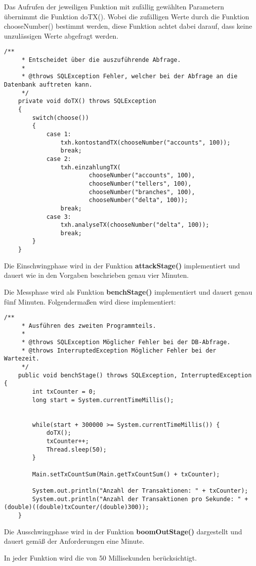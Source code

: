 Das Aufrufen der jeweiligen Funktion mit zufällig gewählten Parametern übernimmt die Funktion
doTX(). Wobei die zufälligen Werte durch die Funktion chooseNumber() bestimmt
werden, diese Funktion achtet dabei darauf, dass keine unzulässigen Werte
abgefragt werden.


\begin{lstlisting}[caption={doTX-Funktion in ProgramStage.java}]
	/**
	 * Entscheidet über die auszuführende Abfrage.
	 * 
	 * @throws SQLException Fehler, welcher bei der Abfrage an die Datenbank auftreten kann.
	 */
	private void doTX() throws SQLException
	{
		switch(choose())
		{
			case 1:
				txh.kontostandTX(chooseNumber("accounts", 100));
				break;
			case 2:
				txh.einzahlungTX(
						chooseNumber("accounts", 100),
						chooseNumber("tellers", 100),
						chooseNumber("branches", 100),
						chooseNumber("delta", 100));
				break;
			case 3:
				txh.analyseTX(chooseNumber("delta", 100));
				break;
		}
	}
\end{lstlisting}

Die Einschwingphase wird in der Funktion \textbf{attackStage()} implementiert
und dauert wie in den Vorgaben beschrieben genau vier Minuten.

Die Messphase wird als Funktion \textbf{benchStage()} implementiert und dauert
genau fünf Minuten. Folgendermaßen wird diese implementiert:

\begin{lstlisting}[caption={benchStage-Funktion in ProgramStage.java}]
	/**
	 * Ausführen des zweiten Programmteils.
	 * 
	 * @throws SQLException Möglicher Fehler bei der DB-Abfrage.
	 * @throws InterruptedException Möglicher Fehler bei der Wartezeit.
	 */
	public void benchStage() throws SQLException, InterruptedException {
		int txCounter = 0;
		long start = System.currentTimeMillis();
		
		
		while(start + 300000 >= System.currentTimeMillis()) {
			doTX();
			txCounter++;
			Thread.sleep(50);	
		}
		
		Main.setTxCountSum(Main.getTxCountSum() + txCounter);
		
		System.out.println("Anzahl der Transaktionen: " + txCounter);
		System.out.println("Anzahl der Transaktionen pro Sekunde: " + (double)((double)txCounter/(double)300));
	}
\end{lstlisting}

Die Ausschwingphase wird in der Funktion \textbf{boomOutStage()} dargestellt und
dauert gemäß der Anforderungen eine Minute.

In jeder Funktion wird die  von 50 Millisekunden berücksichtigt.


